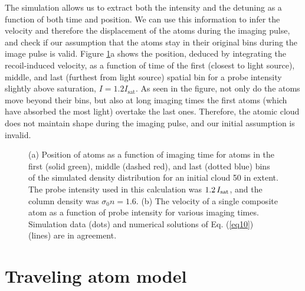 The simulation allows us to extract both the intensity and the detuning as a function of both time and position. We can use this information to infer the velocity and therefore the displacement of the atoms during the imaging pulse, and check if our assumption that the atoms stay in their original bins during the image pulse is valid. Figure \ref{fig:simTests}a shows the position, deduced by integrating the recoil-induced velocity, as a function of time of the first (closest to light source), middle, and last  (furthest from light source) spatial bin for a probe intensity slightly above saturation, $I = 1.2 I_{\mathrm{sat}}$. As seen in the figure, not only do the atoms move beyond their bins, but also at long imaging times the first atoms (which have absorbed the most light) overtake the last ones. Therefore, the atomic cloud does not maintain shape during the imaging pulse, and our initial assumption is invalid.  

\begin{figure}
\caption[Checking stationary atom assumption]{(a) Position of atoms as a function of imaging time for atoms in the first (solid green), middle (dashed red), and last (dotted blue) bins of the simulated density distribution for an initial cloud 50 \um{} in extent. The probe intensity used in this calculation was $1.2\, I_{\rm{sat}}$, and the column density was $\sigma_0 n=1.6$. (b) The velocity of a single composite atom as a function of probe intensity for various imaging times. Simulation data (dots) and numerical  solutions of Eq. (\ref{eq10}) (lines) are in agreement.}
\label{fig:simTests}
\end{figure}	

%


\section{Traveling atom model}

